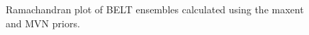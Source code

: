 \documentclass[journal=jacsat,manuscript=article]{achemso}
\begin{document}
\begin{figure}

\caption{
Ramachandran plot of BELT ensembles calculated using the maxent and MVN priors.
}
\label{figure:Rama_priors}
\end{figure}

\newpage
\end{document}
